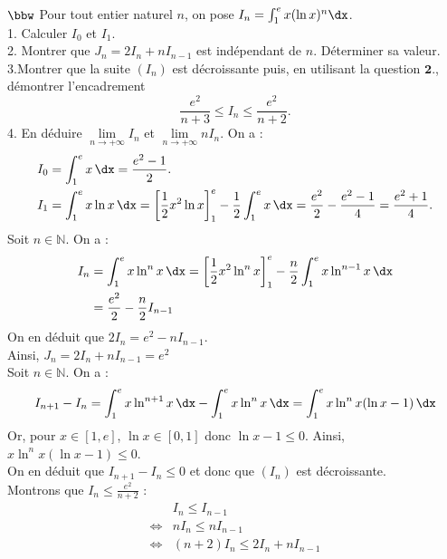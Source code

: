 \documentclass[11pt]{article}
\begin{document}
\pagebreak

\begin{exercice}{$\bbw$}{}
    Pour tout entier naturel $n$, on pose $I_n=\int_1^e{x(\ln x)^n\dx}$.\\
    1. Calculer $I_0$ et $I_1$.\\
    2. Montrer que $J_n=2I_n+nI_{n-1}$ est indépendant de $n$. Déterminer sa valeur.\\
    3.\hspace{0.2cm}Montrer que la suite $(I_n)$ est décroissante puis, en utilisant la question $\mathbf{2.}$, démontrer l'encadrement
    \begin{equation*}
        \frac{e^2}{n+3} \leq I_n \leq \frac{e^2}{n+2}.
    \end{equation*}  
    4. En déduire $\lim\limits_{n\to+\infty}{I_n}$ et $\lim\limits_{n\to+\infty}{nI_n}$.
    \tcblower
     On a : 
    \begin{align*}
        &I_0=\int_1^e{x\,\dx}=\frac{e^2-1}{2}.\\
        &I_1=\int_1^e{x\ln x\,\dx}=\left[\frac{1}{2}x^2\ln x\right]_1^e-\frac{1}{2}\int_1^e{x\,\dx}=\frac{e^2}{2}-\frac{e^2-1}{4}=\frac{e^2+1}{4}.
    \end{align*}
     Soit $n\in\mathbb{N}$. On a :
    \begin{align*}
        I_n &= \int_1^e{x\ln^nx\,\dx} = \left[\frac{1}{2}x^2\ln^nx\right]_1^e-\frac{n}{2}\int_1^e{x\ln^{n-1}x\,\dx}\\
        &=\frac{e^2}{2}-\frac{n}{2}I_{n-1}
    \end{align*}
    On en déduit que $2I_n=e^2-nI_{n-1}$.\\
    Ainsi, $J_n = 2I_n + nI_{n-1} = e^2$\\
     Soit $n\in\mathbb{N}$. On a : 
    \begin{align*}
        I_{n+1} - I_{n} = \int_1^e{x\ln^{n+1}x\,\dx} - \int_1^e{x\ln^{n}x\,\dx} = \int_1^e{x\ln^nx(\ln x-1)\,\dx}
    \end{align*}
    Or, pour $x\in\left[1,e\right]$, $\ln x \in [0,1]$ donc $\ln x - 1 \leq 0$. Ainsi, $x\ln^nx(\ln x-1) \leq 0$.\\
    On en déduit que $I_{n+1}-I_n\leq0$ et donc que $(I_n)$ est décroissante.\\
    Montrons que $I_n \leq \frac{e^2}{n+2}$ :
    \begin{align*}
        &I_n \leq I_{n-1}\\
        \iff&nI_n \leq nI_{n-1}\\
        \iff&(n+2)I_n \leq 2I_n + nI_{n-1}\\

\end{align*}
\end{exercice}
\end{document}
